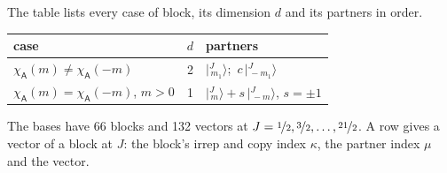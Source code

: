 \documentclass[10pt,a4paper]{article}
\numberwithin{equation}{section}
\newcommand{\grp}[1]{\mathsf{#1}}
\newcommand{\chiA}{\chi_{\grp{A}}}
\newcommand{\mult}{\kappa}
\newcommand{\intx}{\mu}
\newcommand{\jm}[2]{\bigl\lvert{}^{#1}_{\,#2}\bigr\rangle}
\begin{document}
\leavevmode\label{n:head.case}\label{n:head.partners}The table lists every case of block, its dimension $d$ and its partners in order.
\begin{center}\begin{tabular}{@{}lrl@{}}\toprule
case & $d$ & partners\\\midrule
$\chiA(m) \ne \chiA(-m)$ & 2 & $\jm{J}{m_1}$;\ $c\,\jm{J}{-m_1}$\\
$\chiA(m) = \chiA(-m)$, $m > 0$ & 1 & $\jm{J}{m} + s\,\jm{J}{-m}$, $s = \pm1$\\
\bottomrule\end{tabular}\end{center}
The bases have 66 blocks and 132 vectors at $J = \nicefrac{1}{2}, \nicefrac{3}{2}, \dots, \nicefrac{21}{2}$. \label{n:head.vector}A row gives a vector of a block at $J$: the block's irrep and copy index $\mult$, the partner index $\intx$ and the vector.
\end{document}
